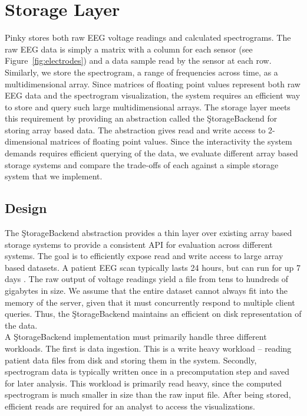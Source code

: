 \chapter{Storage Layer}\label{storage-ch}

Pinky stores both raw EEG voltage readings and calculated spectrograms. The raw
EEG data is simply a matrix with a column for each sensor (see
Figure~\ref{fig:electrodes}) and a data sample read by the sensor at each row.
Similarly, we store the spectrogram, a range of frequencies across time, as a
multidimensional array. Since matrices of floating point values represent both
raw EEG data and the spectrogram visualization, the system requires an
efficient way to store and query such large multidimensional arrays. The
storage layer meets this requirement by providing an abstraction called the
\c{StorageBackend} for storing array based data. The abstraction gives read and
write access to 2-dimensional matrices of floating point values. Since the
interactivity the system demands requires efficient querying of the data, we
evaluate different array based storage systems and compare the trade-offs of
each against a simple storage system that we implement.

\section{Design}

The \c{StorageBackend} abstraction provides a thin layer over existing array
based storage systems to provide a consistent API for evaluation across
different systems. The goal is to efficiently expose read and write access to
large array based datasets. A patient EEG scan typically lasts 24 hours, but
can run for up 7 days \cite{ceeg-3}. The raw output of voltage readings yield a
file from tens to hundreds of gigabytes in size. We assume that the entire
dataset cannot always fit into the memory of the server, given that it must
concurrently respond to multiple client queries. Thus, the \c{StorageBackend}
maintains an efficient on disk representation of the data. \\

A \c{StorageBackend} implementation must primarily handle three different
workloads. The first is data ingestion. This is a write heavy workload --
reading patient data files from disk and storing them in the system. Secondly,
spectrogram data is typically written once in a precomputation step and saved
for later analysis. This workload is primarily read heavy, since the computed
spectrogram is much smaller in size than the raw input file.  After being
stored, efficient reads are required for an analyst to access the
visualizations.

